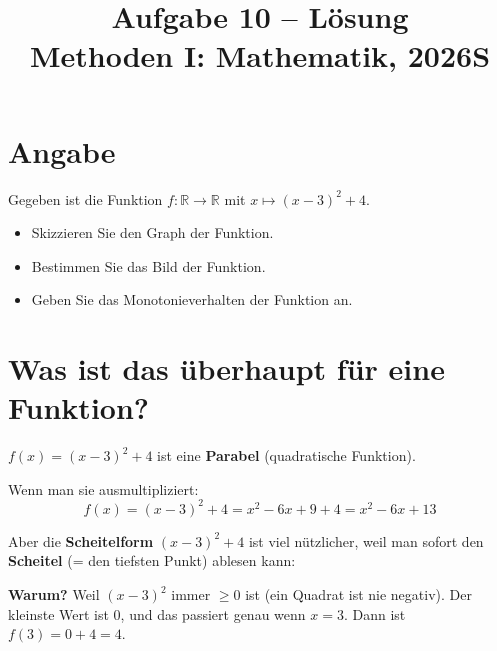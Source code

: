 \documentclass[12pt, a4paper]{article}
\title{\textbf{Aufgabe 10 -- Lösung} \\ Methoden I: Mathematik, 2026S}
\author{}
\date{}
\begin{document}
\maketitle

\section*{Angabe}

Gegeben ist die Funktion $f : \mathbb{R} \to \mathbb{R}$ mit $x \mapsto (x - 3)^2 + 4$.

\begin{itemize}
    \item Skizzieren Sie den Graph der Funktion.
    \item Bestimmen Sie das Bild der Funktion.
    \item Geben Sie das Monotonieverhalten der Funktion an.
\end{itemize}

\section*{Was ist das überhaupt für eine Funktion?}

$f(x) = (x - 3)^2 + 4$ ist eine \textbf{Parabel} (quadratische Funktion).

Wenn man sie ausmultipliziert:
\[
    f(x) = (x-3)^2 + 4 = x^2 - 6x + 9 + 4 = x^2 - 6x + 13
\]

Aber die \textbf{Scheitelform} $(x - 3)^2 + 4$ ist viel nützlicher, weil man sofort den \textbf{Scheitel} (= den tiefsten Punkt) ablesen kann:

\begin{center}
\end{center}

\textbf{Warum?} Weil $(x - 3)^2$ immer $\geq 0$ ist (ein Quadrat ist nie negativ). Der kleinste Wert ist $0$, und das passiert genau wenn $x = 3$. Dann ist $f(3) = 0 + 4 = 4$.

\end{document}
